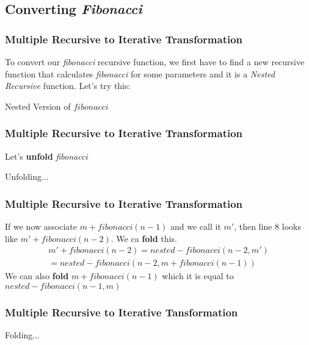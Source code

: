 \documentclass{beamer}
\begin{document}
\subsection{Converting \textit{Fibonacci}}
\begin{frame}
	\frametitle{Multiple Recursive to Iterative Transformation}
	To convert our \textit{fibonacci} recursive function, we first have to find a new recursive function that calculates \textit{fibonacci} for some parameters and it is a \textit{Nested Recursive} function. Let's try this:
	\begin{block}{Nested Version of $fibonacci$}
		\begin{algorithmic}[1]
				\State{}
			\EndProcedure
		\end{algorithmic}
	\end{block}
\end{frame}
\begin{frame}
	\frametitle{Multiple Recursive to Iterative Transformation}
	Let's \textbf{unfold} \textit{fibonacci}
	\begin{block}{Unfolding...}
		\begin{algorithmic}[1]
					\State{}
				\Else
						\State{}
					\Else
						\State{}
					\EndIf
				\EndIf
			\EndProcedure
		\end{algorithmic}
	\end{block}
\end{frame}
\begin{frame}
	\frametitle{Multiple Recursive to Iterative Transformation}
	If we now associate $m + fibonacci(n-1)$ and we call it $m'$, then line $8$ looks like $m' + fibonacci(n-2)$. We ca \textbf{fold} this. 
	\begin{equation}
		\begin{split}
		m' + fibonacci(n-2) = nested-fibonacci(n-2,m') \\ =
		nested-fibonacci(n-2, m + fibonacci(n-1))
		\end{split}
	\end{equation}
	We can also \textbf{fold} $m + fibonacci(n-1)$ which it is equal to $nested-fibonacci(n-1,m)$
\end{frame}
\begin{frame}
	\frametitle{Multiple Recursive to Iterative Tansformation}
	\begin{block}{Folding...}
		\begin{algorithmic}[1]
			\tiny
					\State{}
				\Else
						\State{}
					\Else
						\State{}
					\EndIf
				\EndIf
			\EndProcedure
		\end{algorithmic}
	\end{block}
\end{frame}
\end{document}
